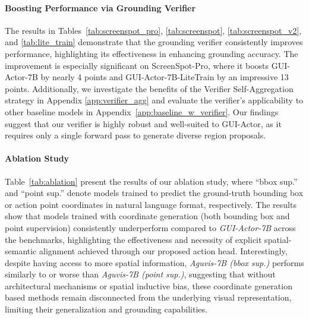 \documentclass{article}
\begin{document}
\paragraph{Boosting Performance via Grounding Verifier} The results in Tables~\ref{tab:screenspot_pro}, \ref{tab:screenspot}, \ref{tab:screenspot_v2}, and \ref{tab:lite_train} demonstrate that the grounding verifier consistently improves performance, highlighting its effectiveness in enhancing grounding accuracy. The improvement is especially significant on ScreenSpot-Pro, where it boosts GUI-Actor-7B by nearly 4 points and GUI-Actor-7B-LiteTrain by an impressive 13 points. Additionally, we investigate the benefits of the Verifier Self-Aggregation strategy in Appendix \ref{app:verifier_agg} and evaluate the verifier's applicability to other baseline models in Appendix~\ref{app:baseline_w_verifier}. Our findings suggest that our verifier is highly robust and well-suited to GUI-Actor, as it requires only a single forward pass to generate diverse region proposals.



\paragraph{Ablation Study}
\label{sec:ablation}
Table~\ref{tab:ablation} present the results of our ablation study, where “bbox sup.” and “point sup.” denote models trained to predict the ground-truth bounding box or action point coordinates in natural language format, respectively. The results show that models trained with coordinate generation (both bounding box and point supervision) consistently underperform compared to \textit{GUI-Actor-7B} across the benchmarks, highlighting the effectiveness and necessity of explicit spatial-semantic alignment achieved through our proposed action head. Interestingly, despite having access to more spatial information, \textit{Aguvis-7B (bbox sup.)} performs similarly to or worse than \textit{Aguvis-7B (point sup.)}, suggesting that without architectural mechanisms or spatial inductive bias, these coordinate generation based methods remain disconnected from the underlying visual representation, limiting their generalization and grounding capabilities.


% 
% 
\end{document}
